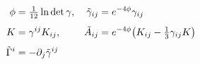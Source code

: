\documentclass[preview]{standalone}
\begin{document}
\begin{align*}
\special{dvisvgm:raw <g id='unique000'>}\begin{aligned}
            \phi &= \tfrac{1}{12}\ln\det\gamma, & \tilde\gamma_{ij} &= e^{-4\phi}\gamma_{ij}\\[4pt]
            K &= \gamma^{ij}K_{ij}, & \tilde A_{ij} &= e^{-4\phi}\big(K_{ij}-\tfrac13\gamma_{ij}K\big)\\[4pt]
            \tilde\Gamma^i &= -\partial_j\tilde\gamma^{ij}
            \end{aligned}\special{dvisvgm:raw </g>}
\end{align*}
\end{document}
